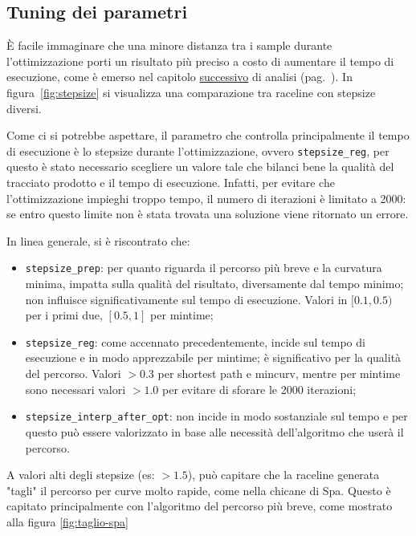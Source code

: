 \subsection{Tuning dei parametri}
\label{par:tuning}
È facile immaginare che una minore distanza tra i sample durante l'ottimizzazione porti un risultato più
preciso a costo di aumentare il tempo di esecuzione, come è emerso nel capitolo
\href{sec:exec-time}{successivo} di analisi (pag.~\pageref{sec:exec-time}).
In figura~\ref{fig:stepsize} si visualizza una comparazione tra raceline con stepsize diversi.

Come ci si potrebbe aspettare, il parametro che controlla principalmente il tempo di esecuzione è lo
stepsize durante l'ottimizzazione, ovvero \verb|stepsize_reg|, per questo è stato necessario scegliere un
valore tale che bilanci bene la qualità del tracciato prodotto e il tempo di esecuzione. Infatti, per
evitare che l'ottimizzazione impieghi troppo tempo, il numero di iterazioni è limitato a 2000: se entro
questo limite non è stata trovata una soluzione viene ritornato un errore.

In linea generale, si è riscontrato che:
\begin{itemize}
	\item \verb|stepsize_prep|: per quanto riguarda il percorso più breve e la curvatura minima, impatta
		sulla qualità del risultato, diversamente dal tempo minimo; non influisce significativamente sul
		tempo di esecuzione. Valori in $[0.1, 0.5)$ per i primi due, $[0.5, 1]$ per mintime;
	\item \verb|stepsize_reg|: come accennato precedentemente, incide sul tempo di esecuzione
		e in modo apprezzabile per mintime; è significativo per la qualità del percorso. Valori $ > 0.3$
		per shortest path e mincurv, mentre per mintime sono necessari valori $> 1.0$ per evitare di
		sforare le 2000 iterazioni;
	\item \verb|stepsize_interp_after_opt|: non incide in modo sostanziale sul tempo e per questo può
		essere valorizzato in base alle necessità dell'algoritmo che userà il percorso.
\end{itemize}
A valori alti degli stepsize (es: $> 1.5$), può capitare che la raceline generata "tagli" il percorso per
curve molto rapide, come nella chicane di Spa. Questo è capitato principalmente con l'algoritmo del
percorso più breve, come mostrato alla figura \ref{fig:taglio-spa}

